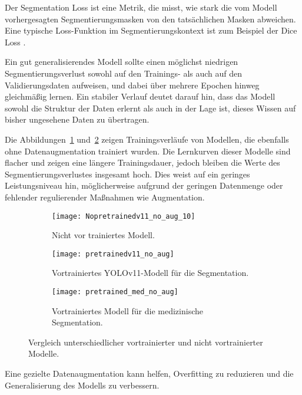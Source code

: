 \documentclass[
	german,
	accentcolor=10c,%
	type=intern,
	marginpar=false
	]{tudapub}
\begin{document}
Der Segmentation Loss ist eine Metrik, die misst, wie stark die vom Modell vorhergesagten Segmentierungsmasken von den tatsächlichen Masken abweichen. Eine typische Loss-Funktion im Segmentierungskontext ist zum Beispiel der Dice Loss \cite{Ultralytics2025Jul}.

Ein gut generalisierendes Modell sollte einen möglichst niedrigen Segmentierungsverlust sowohl auf den Trainings- als auch auf den Validierungsdaten aufweisen, und dabei über mehrere Epochen hinweg gleichmäßig lernen. Ein stabiler Verlauf deutet darauf hin, dass das Modell sowohl die Struktur der Daten erlernt als auch in der Lage ist, dieses Wissen auf bisher ungesehene Daten zu übertragen.

Die Abbildungen~\ref{fig:Nopretrainedv11_no_aug_10} und~\ref{fig:pretrainedv11_no_aug} zeigen Trainingsverläufe von Modellen, die ebenfalls ohne Datenaugmentation trainiert wurden. Die Lernkurven dieser Modelle sind flacher und zeigen eine längere Trainingsdauer, jedoch bleiben die Werte des Segmentierungsverlustes insgesamt hoch. Dies weist auf ein geringes Leistungsniveau hin, möglicherweise aufgrund der geringen Datenmenge oder fehlender regulierender Maßnahmen wie Augmentation.

\begin{figure}[h]
    \centering
    \begin{subfigure}[b]{0.3\textwidth}
        \texttt{[image: Nopretrainedv11\_no\_aug\_10]}
        \caption{Nicht vor trainiertes Modell.}
        \label{fig:Nopretrainedv11_no_aug_10}
    \end{subfigure}
    \hfill
    \begin{subfigure}[b]{0.3\textwidth}
        \texttt{[image: pretrainedv11\_no\_aug]}
        \caption{Vortrainiertes YOLOv11-Modell für die Segmentation.}
        \label{fig:pretrainedv11_no_aug}
    \end{subfigure}
    \hfill
    \begin{subfigure}[b]{0.3\textwidth}
        \texttt{[image: pretrained\_med\_no\_aug]}
        \caption{Vortrainiertes Modell für die medizinische Segmentation.}
        \label{fig:pretrained_med_no_aug}
    \end{subfigure}    
    \caption{Vergleich unterschiedlicher vortrainierter und nicht vortrainierter Modelle.}
    \label{fig:no_aug}
\end{figure}

Eine gezielte Datenaugmentation kann helfen, Overfitting zu reduzieren und die Generalisierung des Modells zu verbessern.
\end{document}
